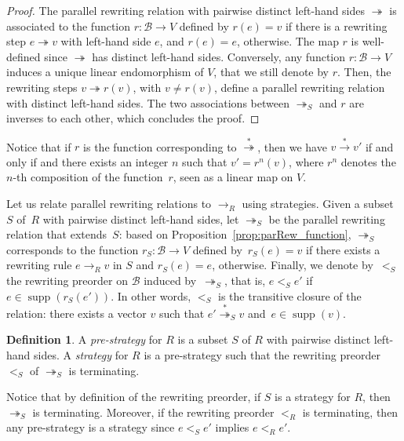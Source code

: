 \documentclass[11pt]{article}
\theoremstyle{definition}
\newtheorem{definition}[theorem]{Definition}
\newcommand\basis{\mathscr{B}}
\newcommand\ordS{<_S}
\DeclareMathOperator{\supp}{supp}
\newcommand\rewR{\to_R}
\newcommand\parRew{\twoheadrightarrow}
\newcommand\parS{\twoheadrightarrow_S}
\newcommand\transRew{\overset{*}{\to}}
\newcommand\transParS{\overset{*}{\twoheadrightarrow}_S}
\newcommand\transParRew{\overset{*}{\twoheadrightarrow}}
\begin{document}
\begin{proof}
  The parallel rewriting relation with pairwise distinct left-hand sides
  $\parRew$ is associated to the function $r:\basis\to V$ defined by
  $r(e)=v$ if there is a rewriting step $e\parRew v$ with left-hand side
  $e$, and $r(e)=e$, otherwise. The map $r$ is well-defined since
  $\parRew$ has distinct left-hand sides. Conversely, any function 
  $r:\basis\to V$ induces a unique linear endomorphism of $V$, that we
  still denote by $r$. Then, the rewriting steps $v\parRew r(v)$, with
  $v\neq r(v)$, define a parallel rewriting relation with distinct
  left-hand sides. The two associations between $\parS$ and $r$ are
  inverses to each other, which concludes the proof. 
\end{proof}

Notice that if $r$ is the function corresponding to $\transParRew$, then
we have $v\transRew v'$ if and only if and there exists an integer $n$
such that $v'=r^n(v)$, where $r^n$ denotes the $n$-th composition of the
function~$r$, seen as a linear map on $V$. 
\medskip

Let us relate parallel rewriting relations to $\rewR$ using strategies.
Given a subset~$S$ of~$R$ with pairwise distinct left-hand sides, let
$\parS$ be the parallel rewriting relation that extends~$S$: based on 
Proposition~\ref{prop:parRew_function}, $\parS$ corresponds to the
function $r_S:\basis\to V$ defined by~$r_S(e)=v$ if there exists a
rewriting rule $e\rewR v$ in $S$ and $r_S(e)=e$, otherwise. Finally, we
denote by~$\ordS$ the rewriting preorder on $\basis$ induced by~$\parS$,
that is, $e\ordS e'$ if $e\in\supp(r_S(e'))$. In other words, $\ordS$ is
the transitive closure of the relation: there exists a vector $v$ such
that $e'\transParS v$ and~$e\in\supp(v)$.
\smallskip

\begin{definition}\label{def:strategies}
  A {\em pre-strategy} for $R$ is a subset $S$ of $R$ with pairwise
  distinct left-hand sides. A {\em strategy} for $R$ is a pre-strategy
  such that the rewriting preorder $\ordS$ of $\parS$ is terminating. 
\end{definition}
\smallskip

Notice that by definition of the rewriting preorder, if $S$ is a strategy
for $R$, then $\parS$ is terminating. Moreover, if the rewriting preorder
$<_R$ is terminating, then any pre-strategy is a strategy since
$e\ordS e'$ implies $e<_Re'$.
\smallskip
\end{document}
